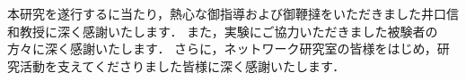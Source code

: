 本研究を遂行するに当たり，熱心な御指導および御鞭撻をいただきました井口信和教授に深く感謝いたします．
また，実験にご協力いただきました被験者の方々に深く感謝いたします．
さらに，ネットワーク研究室の皆様をはじめ，研究活動を支えてくださりました皆様に深く感謝いたします．